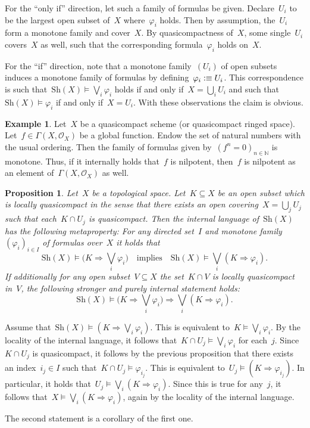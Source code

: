\documentclass[10pt,reqno,a4paper]{amsbook}
\makeatletter
\theoremstyle{definition}
\newtheorem{ex}[defn]{Example}
\theoremstyle{plain}
\newtheorem{prop}[defn]{Proposition}
\theoremstyle{remark}
\renewcommand{\O}{\mathcal{O}}
\newcommand{\NN}{\mathbb{N}}
\newcommand{\Sh}{\mathrm{Sh}}
\newcommand{\?}{\,{:}\,}
\renewcommand{\_}{\mathpunct{.}\,}
\newcommand{\defequiv}{\vcentcolon\equiv}
\renewenvironment{proof}[1][\proofname]{\par
  \pushQED{\qed}%
  \normalfont \topsep6\p@\@plus6\p@\relax
  \trivlist
  \item[\hskip\labelsep
        \itshape
    #1\@addpunct{.}]\ignorespaces
}{%
  \popQED\endtrivlist\@endpefalse
}
\makeatother
\begin{document}
\begin{proof}For the ``only if'' direction, let such a family of formulas be
given. Declare~$U_i$ to be the largest open subset of~$X$ where~$\varphi_i$
holds. Then by assumption, the~$U_i$ form a monotone family and cover~$X$. By
quasicompactness of~$X$, some single~$U_i$ covers~$X$ as well, such that the
corresponding formula~$\varphi_i$ holds on~$X$.

For the ``if'' direction, note that a monotone family~$(U_i)$ of open subsets
induces a monotone family of formulas by defining~$\varphi_i \defequiv U_i$. This
correspondence is such that~$\Sh(X) \models \bigvee_i \varphi_i$ holds if and
only if~$X = \bigcup_i U_i$ and such that~$\Sh(X) \models \varphi_i$ if and
only if~$X = U_i$. With these observations the claim is obvious.
\end{proof}

\begin{ex}\label{ex:nilpotency-directed}
Let~$X$ be a quasicompact scheme (or quasicompact ringed space).
Let~$f \in \Gamma(X,\O_X)$ be a global function. Endow the set of natural
numbers with the usual ordering. Then the family of formulas given by~$(f^n =
0)_{n \in \NN}$ is monotone. Thus, if it internally holds that~$f$ is
nilpotent, then~$f$ is nilpotent as an element of~$\Gamma(X,\O_X)$ as
well.\end{ex}

\begin{prop}Let~$X$ be a topological space. Let~$K \subseteq X$ be an open
subset which is \emph{locally quasicompact} in the sense that there exists an open
covering~$X = \bigcup_j U_j$ such that each~$K \cap U_j$ is quasicompact. Then the
internal language of~$\Sh(X)$ has the following metaproperty: For any
directed set~$I$ and monotone family~$(\varphi_i)_{i \in I}$ of formulas
over~$X$ it holds that
\[ \Sh(X) \models \bigl(K \Rightarrow \bigvee_i \varphi_i\bigr)
  \quad\text{implies}\quad
  \Sh(X) \models \bigvee_i (K \Rightarrow \varphi_i). \]
If additionally for any open subset~$V \subseteq X$ the set~$K \cap V$ is
locally quasicompact in~$V$, the following stronger and purely internal
statement holds:
\[ \Sh(X) \models \bigl(K \Rightarrow \bigvee_i \varphi_i\bigr)
  \Longrightarrow
  \bigvee_i (K \Rightarrow \varphi_i). \]
\end{prop}
\begin{proof}Assume that~$\Sh(X) \models (K \Rightarrow \bigvee_i \varphi_i)$.
This is equivalent to~$K \models \bigvee_i \varphi_i$. By the locality of the
internal language, it follows that~$K \cap U_j \models \bigvee_i \varphi_i$ for each~$j$.
Since~$K \cap U_j$ is quasicompact, it follows by the previous proposition that
there exists an index~$i_j \in I$ such that~$K \cap U_j \models \varphi_{i_j}$.
This is equivalent to~$U_j \models (K \Rightarrow \varphi_{i_j})$. In
particular, it holds that~$U_j \models \bigvee_i (K \Rightarrow \varphi_i)$.
Since this is true for any~$j$, it follows that~$X \models \bigvee_i (K
\Rightarrow \varphi_i)$, again by the locality of the internal language.

The second statement is a corollary of the first one.
\end{proof}
\end{document}
